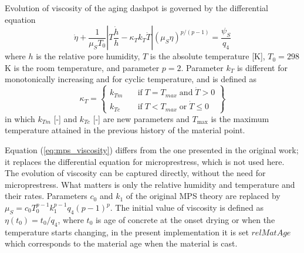 \documentclass[a4paper]{article}
\begin{document}
Evolution of viscosity of the aging dashpot is governed by the differential
equation 
\begin{equation}
\label{eq:mps_viscosity}
\dot{\eta}+\frac{1}{\mu_S T_0} \left |  T \frac{\dot{h}}{h} - \kappa_T k_T \dot{T}  \right | \left( \mu_S \eta \right)^{p/\left(p-1\right)} = \frac{\psi_S}{q_4}
\end{equation}
where $h$ is the relative pore humidity, $T$ is the absolute temperature [K], $T_0 = 298$ K is the room temperature, and parameter $p = 2$. Parameter $k_T$ is different for monotonically increasing and for cyclic temperature, and is defined as
\begin{equation}
\kappa_T = \left\{ \begin{array}{ll}
k_{Tm} & \quad \mathrm{if} \; T = T_{max} \; \mathrm{and} \; \dot{T} > 0 \\
k_{Tc} & \quad \mathrm{if} \; T < T_{max} \; \mathrm{or} \; \dot{T} \leq 0 
\end{array} \right\}
\label{eq:mps_temperature}
\end{equation}
in which  $k_{Tm}$ [-] and $k_{Tc}$ [-] are new parameters and $T_{\max}$ is the
maximum temperature attained in the previous history of the material point. 

Equation (\ref{eq:mps_viscosity}) differs from the one presented in the original work; it replaces the differential equation for microprestress, which is not used here. The evolution of viscosity can be captured directly, without the need for microprestress. What matters is only the relative humidity and temperature and their rates. Parameters $c_0$ and $k_1$ of the original MPS theory
are replaced by $\mu_S = c_0 T_0^{p-1} k_1^{p-1} q_4 (p-1)^p$. 
The initial value of viscosity is defined as $\eta(t_0) = t_0/q_4$,
where $t_0$ is age of concrete at the onset drying or when the
temperature starts changing, in the present implementation it is set
$relMatAge$ which corresponds to the material age when the material is cast.
\end{document}
